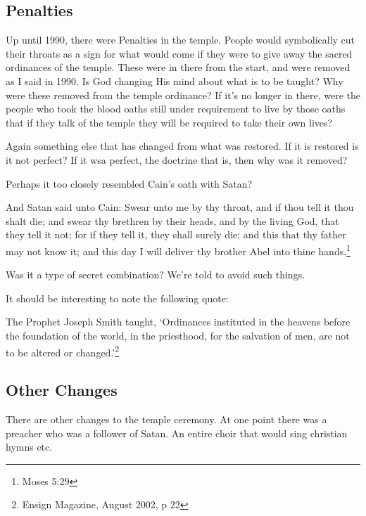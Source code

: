 \subsection{Penalties}

Up until 1990, there were Penalties in the temple. People would symbolically cut
their throats as a sign for what would come if they were to give away the sacred
ordinances of the temple. These were in there from the start, and were removed
as I said in 1990. Is God changing His mind about what is to be taught? Why were
these removed from the temple ordinance? If it's no longer in there, were the
people who took the blood oaths still under requirement to live by those oaths
that if they talk of the temple they will be required to take their own lives?

Again something else that has changed from what was restored. If it is restored
is it not perfect? If it wsa perfect, the doctrine that is, then why was it
removed?

Perhaps it too closely resembled Cain's oath with Satan?

\begin{displayquote}
And Satan said unto Cain: Swear unto me by thy throat, and if thou tell it thou 
shalt die; and swear thy brethren by their heads, and by the living God, that 
they tell it not; for if they tell it, they shall surely die; and this that thy 
father may not know it; and this day I will deliver thy brother Abel into thine 
hands.\footnote{Moses 5:29}
\end{displayquote}

Was it a type of secret combination? We're told to avoid such things.

It should be interesting to note the following quote:

\begin{displayquote}
The Prophet Joseph Smith taught, `Ordinances instituted in the heavens before 
the foundation of the world, in the priesthood, for the salvation of men, 
are not to be altered or changed.'\footnote{Ensign Magazine, August 2002, p 22}
\end{displayquote}

\subsection{Other Changes}

There are other changes to the temple ceremony. At one point there was a
preacher who was a follower of Satan. An entire choir that would sing christian
hymns etc.

